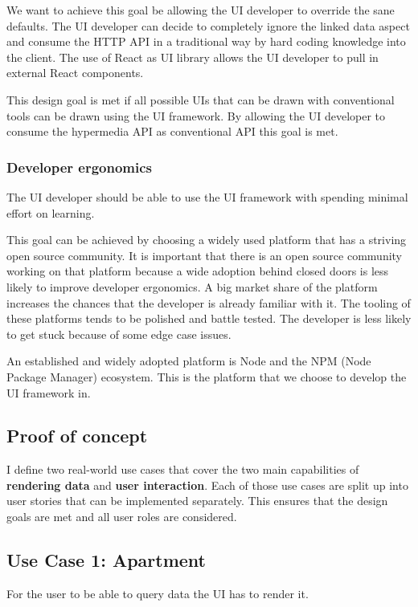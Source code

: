 We want to achieve this goal be allowing the UI developer to override the sane defaults. The UI developer can decide to completely ignore the linked data aspect and consume the HTTP API in a traditional way by hard coding knowledge into the client. The use of React as UI library allows the UI developer to pull in external React components.

This design goal is met if all possible UIs that can be drawn with conventional tools can be drawn using the UI framework. By allowing the UI developer to consume the hypermedia API as conventional API this goal is met.

\subsubsection{Developer ergonomics}\label{usecases}
The UI developer should be able to use the UI framework with spending minimal effort on learning.

This goal can be achieved by choosing a widely used platform that has a striving open source community. It is important that there is an open source community working on that platform because a wide adoption behind closed doors is less likely to improve developer ergonomics.
A big market share of the platform increases the chances that the developer is already familiar with it. The tooling of these platforms tends to be polished and battle tested. The developer is less likely to get stuck because of some edge case issues.

An established and widely adopted platform is Node and the NPM (Node Package Manager) ecosystem. This is the platform that we choose to develop the UI framework in.

\subsection{Proof of concept}
I define two real-world use cases that cover the two main capabilities of \textbf{rendering data} and \textbf{user interaction}. Each of those use cases are split up into user stories that can be implemented separately. This ensures that the design goals are met and all user roles are considered.

\subsection{Use Case 1: Apartment}\label{usecases}
For the user to be able to query data the UI has to render it.

